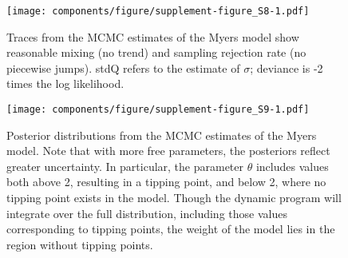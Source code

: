 \documentclass[]{components/elsarticle}
\begin{document}
\begin{figure}[htbp]
\centering
\texttt{[image: components/figure/supplement-figure\_S8-1.pdf]}
\caption{Traces from the MCMC estimates of the Myers model show
reasonable mixing (no trend) and sampling rejection rate (no piecewise
jumps). stdQ refers to the estimate of $\sigma$; deviance is -2 times
the log likelihood.}
\end{figure}

\begin{figure}[htbp]
\centering
\texttt{[image: components/figure/supplement-figure\_S9-1.pdf]}
\caption{Posterior distributions from the MCMC estimates of the Myers
model. Note that with more free parameters, the posteriors reflect
greater uncertainty. In particular, the parameter $\theta$ includes
values both above 2, resulting in a tipping point, and below 2, where no
tipping point exists in the model. Though the dynamic program will
integrate over the full distribution, including those values
corresponding to tipping points, the weight of the model lies in the
region without tipping points.}
\end{figure}
\end{document}
